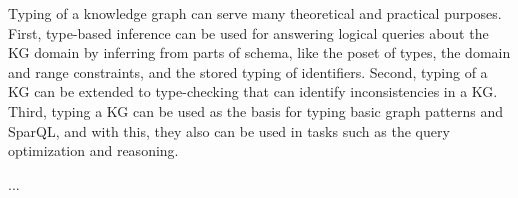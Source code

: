 \documentclass[runningheads]{llncs}
\begin{document}
Typing of a knowledge graph can serve many theoretical and practical
purposes. First, type-based inference can be used for answering
logical queries about the KG domain by inferring from parts
of schema, like the poset of types, the domain and range constraints,
and the stored typing of identifiers. Second, typing of a KG can be
extended to type-checking that can identify inconsistencies in a
KG. Third, typing a KG can be used as the basis for typing basic graph
patterns and SparQL, and with this, they also can be used in tasks
such as the query optimization and reasoning.


... \\





%



\end{document}
